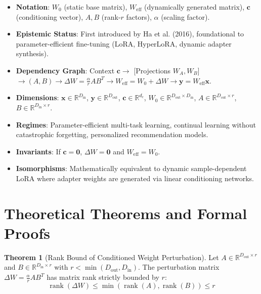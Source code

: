 \documentclass[11pt,a4paper]{article}
\theoremstyle{definition}
\newtheorem{theorem}{\textbf{Theorem}}[section]
\begin{document}
\begin{itemize}
    \item \textbf{Notation}: $W_0$ (static base matrix), $W_{\text{eff}}$ (dynamically generated matrix), $\mathbf{c}$ (conditioning vector), $A, B$ (rank-$r$ factors), $\alpha$ (scaling factor).
    \item \textbf{Epistemic Status}: First introduced by Ha et al. (2016), foundational to parameter-efficient fine-tuning (LoRA, HyperLoRA, dynamic adapter synthesis).
    \item \textbf{Dependency Graph}: Context $\mathbf{c} \to$ [Projections $W_A, W_B$] $\to (A, B) \to \Delta W = \frac{\alpha}{r} A B^T \to W_{\text{eff}} = W_0 + \Delta W \to \mathbf{y} = W_{\text{eff}} \mathbf{x}$.
    \item \textbf{Dimensions}: $\mathbf{x} \in \mathbb{R}^{D_{\text{in}}}$, $\mathbf{y} \in \mathbb{R}^{D_{\text{out}}}$, $\mathbf{c} \in \mathbb{R}^{d_c}$, $W_0 \in \mathbb{R}^{D_{\text{out}} \times D_{\text{in}}}$, $A \in \mathbb{R}^{D_{\text{out}} \times r}$, $B \in \mathbb{R}^{D_{\text{in}} \times r}$.
    \item \textbf{Regimes}: Parameter-efficient multi-task learning, continual learning without catastrophic forgetting, personalized recommendation models.
    \item \textbf{Invariants}: If $\mathbf{c} = \mathbf{0}$, $\Delta W = \mathbf{0}$ and $W_{\text{eff}} = W_0$.
    \item \textbf{Isomorphisms}: Mathematically equivalent to dynamic sample-dependent LoRA where adapter weights are generated via linear conditioning networks.
\end{itemize}

\section{Theoretical Theorems and Formal Proofs}

\begin{theorem}[Rank Bound of Conditioned Weight Perturbation]
Let $A \in \mathbb{R}^{D_{\text{out}} \times r}$ and $B \in \mathbb{R}^{D_{\text{in}} \times r}$ with $r < \min(D_{\text{out}}, D_{\text{in}})$. The perturbation matrix $\Delta W = \frac{\alpha}{r} A B^T$ has matrix rank strictly bounded by $r$:
{\boldmath
\begin{equation}
\operatorname{rank}(\Delta W) \le \min\left( \operatorname{rank}(A), \operatorname{rank}(B) \right) \le r
\end{equation}
}
\end{theorem}
\end{document}
